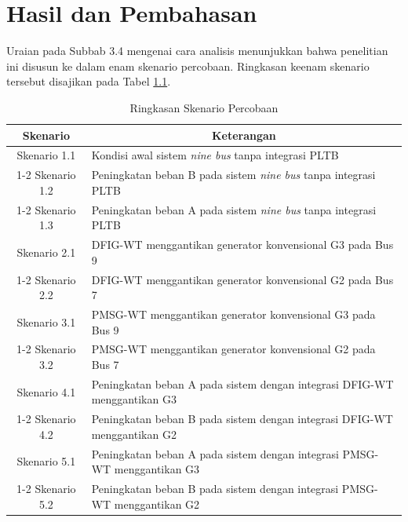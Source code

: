 ﻿\chapter{Hasil dan Pembahasan}

Uraian pada Subbab 3.4 mengenai cara analisis menunjukkan bahwa penelitian ini
disusun ke dalam enam skenario percobaan. Ringkasan keenam skenario tersebut
disajikan pada Tabel \ref{tab:skenario}.

\begin{table}[h]
	\caption{Ringkasan Skenario Percobaan}
	\vspace{0.5em}
	\centering
	\fontsize{12}{14.4}\selectfont
	\begin{tabular}{c p{10cm}}
		\toprule
		\textbf{Skenario} & \multicolumn{1}{c}{\textbf{Keterangan}} \\
		\midrule
		Skenario 1.1  & Kondisi awal sistem \textit{nine bus} tanpa integrasi
		PLTB \\
		\cmidrule(l){1-2} Skenario 1.2 & Peningkatan beban B pada sistem
		\textit{nine bus} tanpa integrasi PLTB \\
		\cmidrule(l){1-2} Skenario 1.3 & Peningkatan beban A pada sistem
		\textit{nine bus} tanpa integrasi PLTB \\
		\midrule
		Skenario 2.1 & DFIG-WT menggantikan generator konvensional G3 pada Bus 9
		\\
		\cmidrule(l){1-2} Skenario 2.2 & DFIG-WT menggantikan generator
		konvensional G2 pada Bus 7 \\
		\midrule
		Skenario 3.1 & PMSG-WT menggantikan generator konvensional G3 pada Bus 9
		\\
		\cmidrule(l){1-2} Skenario 3.2 & PMSG-WT menggantikan generator
		konvensional G2 pada Bus 7 \\
		\midrule
		Skenario 4.1 & Peningkatan beban A pada sistem dengan integrasi DFIG-WT
		menggantikan G3 \\
		\cmidrule(l){1-2} Skenario 4.2 & Peningkatan beban B pada sistem dengan
		integrasi DFIG-WT menggantikan G2 \\
		\midrule
		Skenario 5.1 & Peningkatan beban A pada sistem dengan integrasi PMSG-WT
		menggantikan G3 \\
		\cmidrule(l){1-2} Skenario 5.2 & Peningkatan beban B pada sistem dengan
		integrasi PMSG-WT menggantikan G2 \\
		\bottomrule
	\end{tabular}
	\label{tab:skenario}
\end{table}

